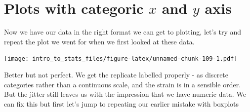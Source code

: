 \documentclass[
]{book}
\newenvironment{Shaded}{\begin{snugshade}}{\end{snugshade}}
\newcommand{\DataTypeTok}[1]{\textcolor[rgb]{0.13,0.29,0.53}{#1}}
\newcommand{\KeywordTok}[1]{\textcolor[rgb]{0.13,0.29,0.53}{\textbf{#1}}}
\newcommand{\NormalTok}[1]{#1}
\newcommand{\OperatorTok}[1]{\textcolor[rgb]{0.81,0.36,0.00}{\textbf{#1}}}
\newcommand{\StringTok}[1]{\textcolor[rgb]{0.31,0.60,0.02}{#1}}
\begin{document}
\begin{Shaded}
\end{Shaded}

\hypertarget{plots-with-categoric-x-and-y-axis}{%
\section{\texorpdfstring{Plots with categoric \(x\) and \(y\) axis}{Plots with categoric x and y axis}}\label{plots-with-categoric-x-and-y-axis}}

Now we have our data in the right format we can get to plotting, let's try and repeat the plot we went for when we first looked at these data.

\begin{Shaded}
\end{Shaded}

\texttt{[image: intro\_to\_stats\_files/figure-latex/unnamed-chunk-109-1.pdf]}

Better but not perfect. We get the replicate labelled properly - as discrete categories rather than a continuous scale, and the strain is in a sensible order. But the jitter still leaves us with the impression that we have numeric data. We can fix this but first let's jump to repeating our earlier mistake with boxplots

\begin{Shaded}
\end{Shaded}
\end{document}
